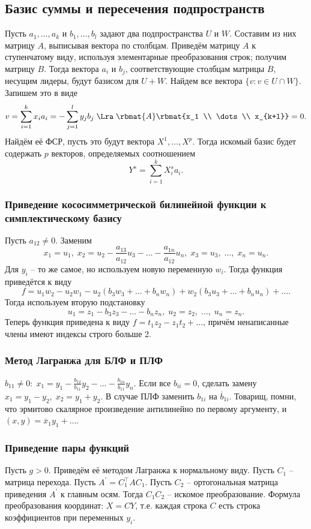\documentclass[a4paper]{article}
\begin{document}
\subsection*{Базис суммы и пересечения подпространств}

Пусть $a_1,\dots,a_k$ и $b_1,\dots,b_l$ задают два подпространства $U$ и $W$. Составим из
них матрицу $A$, выписывая вектора по столбцам. Приведём матрицу $A$ к ступенчатому виду,
используя элементарные преобразования строк; получим матрицу $B$. Тогда вектора $a_i$ и
$b_j$, соответствующие столбцам матрицы $B$, несущим лидеры, будут базисом для $U+W$.
Найдем все вектора $\{v: v \in U \cap W \}$. Запишем это в виде
$$v=\sum_{i=1}^k x_ia_i = - \sum_{j=1}^l y_jb_j \; \Lra \; \rbmat{A} \rbmat{x_1 \\ \dots \\ x_{k+l}}=0.$$
Найдём её ФСР, пусть это будут вектора $X^1,\dots,X^p$. Тогда
искомый базис будет содержать $p$ векторов, определяемых соотношением
$$Y^s=\sum_{i=1}^k X_i^sa_i.$$

\subsubsection*{Приведение кососимметрической билинейной функции к симплектическому базису}
Пусть $a_{12} \neq 0$. Заменим
$$x_1=u_1,\; x_2=u_2-\frac{a_{13}}{a_{12}}u_3-\dots-\frac{a_{1n}}{a_{12}}u_n, \; x_3=u_3, \; \dots, \; x_n=u_n.$$
Для $y_i$ -- то же самое, но используем новую переменную $w_i$. Тогда функция приведётся
к виду $$f=u_1w_2-u_2w_1-u_2(b_3w_3+\dots+b_nw_n)+w_2(b_3u_3+\dots+b_nu_n)+\dots.$$
Тогда используем вторую подстановку
$$u_1=z_1-b_3z_3-\dots-b_nz_n,\; u_2=z_2, \; \dots, \; u_n=z_n.$$
Теперь функция приведена к виду $f=t_1z_2-z_1t_2+\dots$, причём ненаписанные члены имеют индексы
строго больше 2.

\subsubsection*{Метод Лагранжа для БЛФ и ПЛФ}
$b_{11} \neq 0: \; x_1=y_1-\frac{b_{12}}{b_{11}}y_2-\dots-\frac{b_{1n}}{b_{11}}y_n$.
Если все $b_{ii}=0$, сделать замену $x_1=y_1-y_2, \; x_2=y_1+y_2$.
В случае ПЛФ заменить $b_{1i}$ на $\overline{b}_{1i}$. Товарищ, помни, что эрмитово скалярное
произведение антилинейно по первому аргументу, и  $(x,y)=\overline{x}_1y_1+\dots$.

\subsubsection*{Приведение пары функций}
Пусть $g>0$. Приведём её методом Лагранжа к нормальному виду. Пусть $C_1$ -- матрица перехода.
Пусть $A^\prime=C_1^\top AC_1$. Пусть $C_2$ -- ортогональная матрица приведения $A^\prime$ к
главным осям. Тогда $C_1C_2$ -- искомое преобразование. Формула преобразования координат:
$X=CY$, т.е. каждая строка $C$ есть строка коэффициентов при переменных $y_i$.
\end{document}
